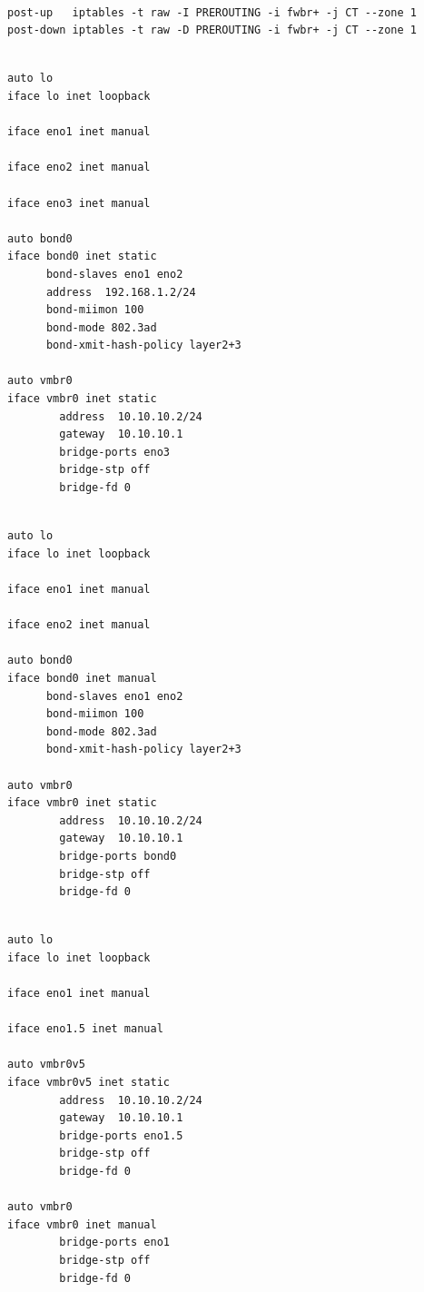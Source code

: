 \begin{lstlisting}

post-up   iptables -t raw -I PREROUTING -i fwbr+ -j CT --zone 1
post-down iptables -t raw -D PREROUTING -i fwbr+ -j CT --zone 1

\end{lstlisting}

\begin{lstlisting}

auto lo
iface lo inet loopback

iface eno1 inet manual

iface eno2 inet manual

iface eno3 inet manual

auto bond0
iface bond0 inet static
      bond-slaves eno1 eno2
      address  192.168.1.2/24
      bond-miimon 100
      bond-mode 802.3ad
      bond-xmit-hash-policy layer2+3

auto vmbr0
iface vmbr0 inet static
        address  10.10.10.2/24
        gateway  10.10.10.1
        bridge-ports eno3
        bridge-stp off
        bridge-fd 0

\end{lstlisting}

\begin{lstlisting}

auto lo
iface lo inet loopback

iface eno1 inet manual

iface eno2 inet manual

auto bond0
iface bond0 inet manual
      bond-slaves eno1 eno2
      bond-miimon 100
      bond-mode 802.3ad
      bond-xmit-hash-policy layer2+3

auto vmbr0
iface vmbr0 inet static
        address  10.10.10.2/24
        gateway  10.10.10.1
        bridge-ports bond0
        bridge-stp off
        bridge-fd 0

\end{lstlisting}

\begin{lstlisting}

auto lo
iface lo inet loopback

iface eno1 inet manual

iface eno1.5 inet manual

auto vmbr0v5
iface vmbr0v5 inet static
        address  10.10.10.2/24
        gateway  10.10.10.1
        bridge-ports eno1.5
        bridge-stp off
        bridge-fd 0

auto vmbr0
iface vmbr0 inet manual
        bridge-ports eno1
        bridge-stp off
        bridge-fd 0

\end{lstlisting}

